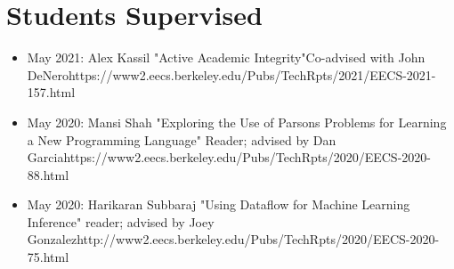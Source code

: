 \section{Students Supervised}

\newcommand{\report}[5]{\item{#1: #2 "{#3}"\newline\footnotesize{#4}\newline\tiny{#5}}}

\vspace{6pt}
\begin{itemize}
  \setlength\itemsep{1em}

    \report{May 2021}{Alex Kassil}{Active Academic Integrity}{Co-advised with John DeNero}{https://www2.eecs.berkeley.edu/Pubs/TechRpts/2021/EECS-2021-157.html}
    
    \report{May 2020}{Mansi Shah}{Exploring the Use of Parsons Problems for Learning a New Programming Language}{\nth{2} Reader; advised by Dan Garcia}{https://www2.eecs.berkeley.edu/Pubs/TechRpts/2020/EECS-2020-88.html}

    \report{May 2020}{Harikaran Subbaraj}
{Using Dataflow for Machine Learning Inference}{\nth{2} reader; advised by Joey Gonzalez}{http://www2.eecs.berkeley.edu/Pubs/TechRpts/2020/EECS-2020-75.html}
\end{itemize}

\vspace{3pt}
